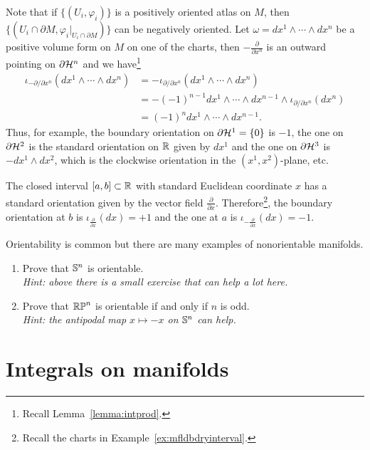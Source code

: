 Note that if $\{(U_i, \varphi_i)\}$ is a positively oriented atlas on $M$, then $\{(U_i\cap\partial M, \varphi_i|_{U_i\cap\partial M})\}$ can be negatively oriented.
Let $\omega = dx^1\wedge\cdots\wedge dx^n$ be a positive volume form on $M$ on one of the charts, then $-\frac{\partial}{\partial x^n}$ is an outward pointing on $\partial \mathcal{H}^n$ and we have\footnote{Recall Lemma~\ref{lemma:intprod}.}
\begin{align}
	\iota_{-{\partial}/\!{\partial x^n}} (dx^1\wedge\cdots\wedge dx^n)
	 & = -\iota_{{\partial}/\!{\partial x^n}} (dx^1\wedge\cdots\wedge dx^n)                           \\
	 & = -(-1)^{n-1} dx^1\wedge\cdots\wedge dx^{n-1}\wedge \iota_{{\partial}/\!{\partial x^n}} (dx^n) \\
	 & = (-1)^n dx^1\wedge\cdots\wedge dx^{n-1}.
\end{align}
Thus, for example, the boundary orientation on $\partial \mathcal{H}^1 = \{0\}$ is $-1$, the one on $\partial \mathcal{H}^2$ is the standard orientation on $\mathbb{R}$ given by $dx^1$ and the one on $\partial \mathcal{H}^3$ is $-dx^1\wedge dx^2$, which is the clockwise orientation in the $(x^1, x^2)$-plane, etc.

\begin{example}\label{ex:int:bdryo}
	The closed interval $[a,b]\subset\mathbb{R}$ with standard Euclidean coordinate $x$ has a standard orientation given by the vector field $\frac{\partial}{\partial x}$.
	Therefore\footnote{Recall the charts in Example~\ref{ex:mfldbdryinterval}.}, the boundary orientation at $b$ is $\iota_{\frac{\partial}{\partial x}}(dx) = +1$ and the one at $a$ is $\iota_{-\frac{\partial}{\partial x}}(dx) = -1$.
\end{example}

\begin{exercise}
	Orientability is common but there are many examples of nonorientable manifolds.
	\begin{enumerate}
		\item Prove that $\mathbb{S}^n$ is orientable.\\
		      \textit{\small Hint: above there is a small exercise that can help a lot here.}
		\item Prove that $\mathbb{RP}^n$ is orientable if and only if $n$ is odd. \\
		      \textit{\small Hint: the antipodal map $x\mapsto -x$ on $\mathbb{S}^n$ can help.}
	\end{enumerate}
\end{exercise}

\section{Integrals on manifolds}

